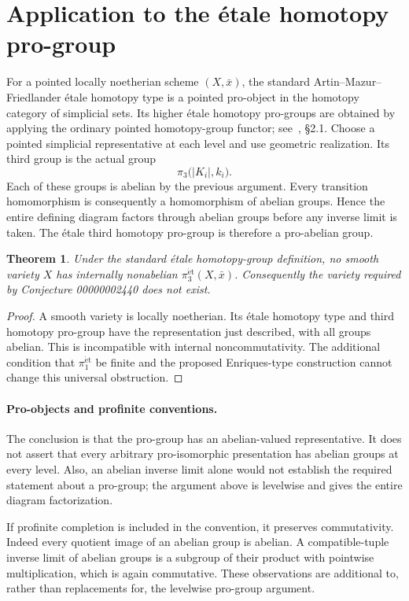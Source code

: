 \documentclass[11pt]{article}
\newtheorem{theorem}{Theorem}
\newcommand{\et}{\mathrm{\acute et}}
\begin{document}
\section*{Application to the \'etale homotopy pro-group}
For a pointed locally noetherian scheme $(X,\bar x)$, the standard
Artin--Mazur--Friedlander \'etale homotopy type is a pointed
pro-object in the homotopy category of simplicial sets. Its
higher \'etale homotopy pro-groups are obtained by applying the
ordinary pointed homotopy-group functor; see~\cite{Moutand}, \S2.1.
Choose a pointed simplicial representative at each level and use
geometric realization. Its third group is the actual group
\[
 \pi_3\bigl(|K_i|,k_i\bigr).
\]
Each of these groups is abelian by the previous argument. Every
transition homomorphism is consequently a homomorphism of abelian
groups. Hence the entire defining diagram factors through
abelian groups before any inverse limit is taken. The \'etale
third homotopy pro-group is therefore a pro-abelian group.

\begin{theorem}
Under the standard \'etale homotopy-group definition, no smooth
variety $X$ has internally nonabelian $\pi_3^{\et}(X,\bar x)$.
Consequently the variety required by Conjecture 00000002440
does not exist.
\end{theorem}
\begin{proof}
A smooth variety is locally noetherian. Its \'etale homotopy type
and third homotopy pro-group have the representation just
described, with all groups abelian. This is incompatible with
internal noncommutativity. The additional condition that
$\pi_1^{\et}$ be finite and the proposed Enriques-type construction
cannot change this universal obstruction.
\end{proof}

\paragraph{Pro-objects and profinite conventions.}
The conclusion is that the pro-group has an abelian-valued
representative. It does not assert that every arbitrary
pro-isomorphic presentation has abelian groups at every level.
Also, an abelian inverse limit alone would not establish the
required statement about a pro-group; the argument above is
levelwise and gives the entire diagram factorization.

If profinite completion is included in the convention, it
preserves commutativity. Indeed every quotient image of an
abelian group is abelian. A compatible-tuple inverse limit of
abelian groups is a subgroup of their product with pointwise
multiplication, which is again commutative. These observations
are additional to, rather than replacements for, the levelwise
pro-group argument.
\end{document}
